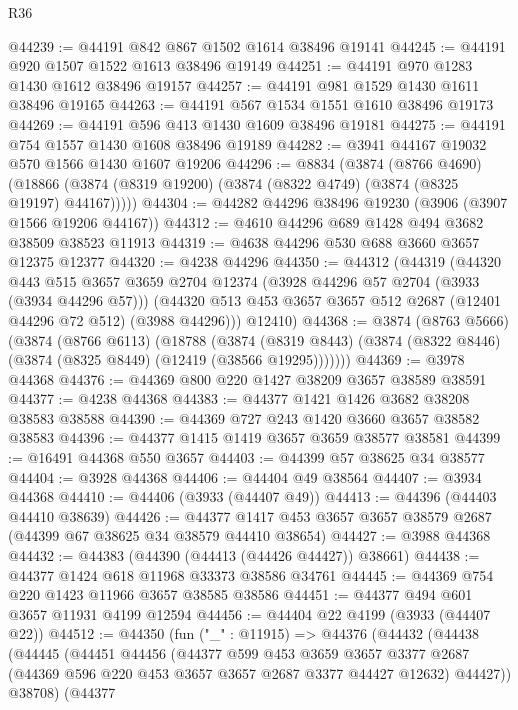 \begin{lexlean}{R36}
\begin{coremodule}
@44239 := @44191 @842 @867 @1502 @1614 @38496 @19141
@44245 := @44191 @920 @1507 @1522 @1613 @38496 @19149
@44251 := @44191 @970 @1283 @1430 @1612 @38496 @19157
@44257 := @44191 @981 @1529 @1430 @1611 @38496 @19165
@44263 := @44191 @567 @1534 @1551 @1610 @38496 @19173
@44269 := @44191 @596 @413 @1430 @1609 @38496 @19181
@44275 := @44191 @754 @1557 @1430 @1608 @38496 @19189
@44282 := @3941 @44167 @19032 @570 @1566 @1430 @1607 @19206
@44296 := @8834
    (@3874
      (@8766 @4690)
      (@18866 (@3874 (@8319 @19200) (@3874 (@8322 @4749) (@3874 (@8325 @19197) @44167)))))
@44304 := @44282 @44296 @38496 @19230 (@3906 (@3907 @1566 @19206 @44167))
@44312 := @4610 @44296 @689 @1428 @494 @3682 @38509 @38523 @11913
@44319 := @4638 @44296 @530 @688 @3660 @3657 @12375 @12377
@44320 := @4238 @44296
@44350 := @44312
    (@44319
      (@44320
        @443
        @515
        @3657
        @3659
        @2704
        @12374
        (@3928 @44296 @57 @2704 (@3933 (@3934 @44296 @57)))
        (@44320 @513 @453 @3657 @3657 @512 @2687 (@12401 @44296 @72 @512) (@3988 @44296)))
      @12410)
@44368 := @3874
    (@8763 @5666)
    (@3874
      (@8766 @6113)
      (@18788
        (@3874 (@8319 @8443) (@3874 (@8322 @8446) (@3874 (@8325 @8449) (@12419 (@38566 @19295)))))))
@44369 := @3978 @44368
@44376 := @44369 @800 @220 @1427 @38209 @3657 @38589 @38591
@44377 := @4238 @44368
@44383 := @44377 @1421 @1426 @3682 @38208 @38583 @38588
@44390 := @44369 @727 @243 @1420 @3660 @3657 @38582 @38583
@44396 := @44377 @1415 @1419 @3657 @3659 @38577 @38581
@44399 := @16491 @44368 @550 @3657
@44403 := @44399 @57 @38625 @34 @38577
@44404 := @3928 @44368
@44406 := @44404 @49 @38564
@44407 := @3934 @44368
@44410 := @44406 (@3933 (@44407 @49))
@44413 := @44396 (@44403 @44410 @38639)
@44426 := @44377 @1417 @453 @3657 @3657 @38579 @2687 (@44399 @67 @38625 @34 @38579 @44410 @38654)
@44427 := @3988 @44368
@44432 := @44383 (@44390 (@44413 (@44426 @44427)) @38661)
@44438 := @44377 @1424 @618 @11968 @33373 @38586 @34761
@44445 := @44369 @754 @220 @1423 @11966 @3657 @38585 @38586
@44451 := @44377 @494 @601 @3657 @11931 @4199 @12594
@44456 := @44404 @22 @4199 (@3933 (@44407 @22))
@44512 := @44350
    (fun ("_" : @11915) =>
    @44376
      (@44432
        (@44438
          (@44445
            (@44451
              @44456
              (@44377
                @599
                @453
                @3659
                @3657
                @3377
                @2687
                (@44369 @596 @220 @453 @3657 @3657 @2687 @3377 @44427 @12632)
                @44427))
            @38708)
          (@44377

\end{coremodule}
\end{lexlean}
